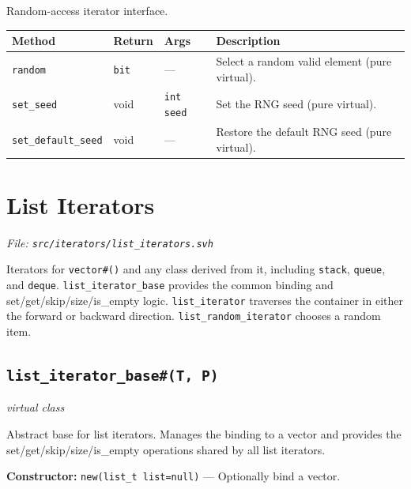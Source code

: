 \documentclass[11pt,letterpaper]{report}
\begin{document}
Random-access iterator interface.

\begin{xltabular}{\linewidth}{>{\small}p{1.35in} >{\small}p{1.25in} >{\small}p{0.95in} >{\small}X}
\toprule
\textbf{Method} & \textbf{Return} & \textbf{Args} & \textbf{Description} \\
\midrule
\endhead
\bottomrule
\endfoot
\texttt{random} & \texttt{bit} & --- & Select a random valid element (pure virtual). \\
\texttt{set\_seed} & void & \texttt{int seed} & Set the RNG seed (pure virtual). \\
\texttt{set\_default\_seed} & void & --- & Restore the default RNG seed (pure virtual). \\
\end{xltabular}

\section{List Iterators}
\noindent\small\textit{File: \texttt{src/iterators/list\_iterators.svh}}\par

Iterators for \texttt{vector\#()} and any class derived from it, including \texttt{stack}, \texttt{queue}, and \texttt{deque}. \texttt{list\_iterator\_base} provides the common binding and set/get/skip/size/is\_empty logic. \texttt{list\_iterator} traverses the container in either the forward or backward direction. \texttt{list\_random\_iterator} chooses a random item.

\subsection*{\texttt{list\_iterator\_base\#(T, P)}}
\noindent\small\textit{virtual class}\par

Abstract base for list iterators. Manages the binding to a vector and provides the set/get/skip/size/is\_empty operations shared by all list iterators.

\noindent\textbf{Constructor:} \texttt{new(list\_t list=null)} --- Optionally bind a vector.
\end{document}

